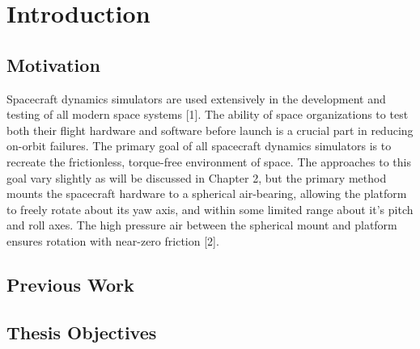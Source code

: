 \chapter{Introduction}

\section{Motivation}
Spacecraft dynamics simulators are used extensively in the development and testing of all modern space systems [1]. The ability of space organizations to test both their flight hardware and software before launch is a crucial part in reducing on-orbit
failures. The primary goal of all spacecraft dynamics simulators is to recreate the frictionless, torque-free environment of space. The approaches to this goal vary slightly as will be discussed in Chapter 2, but the primary method mounts the spacecraft hardware to a spherical air-bearing, allowing the platform to freely rotate about its yaw axis, and within some limited range about it's pitch and roll axes. The high pressure air between the spherical mount and platform ensures rotation with near-zero friction [2].

\section{Previous Work}

\section{Thesis Objectives}

\iffalse 
- Create a balancing system that can be run quickly and achieves similar or better balancing results than previous iterations
- Advance work on the SADS overall design that will be necessary for other subsystems, namely a measurement system and early iteration of a flight computer, track lessons learn
- Compare the results of various balancing methods found in literature on the same platform, provide a clear comparison to theortical and real results, provide practical insights on MBS design and implementation (there is an apprent gap for this in literature, with an abundance of papers providing theoretical approaches, but few providing experimental results, and fewer discussing the details of said experiments)
\fi 